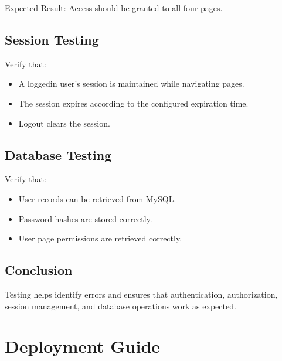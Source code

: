 \documentclass[letterpaper,10pt,english]{sphinxmanual}
\begin{document}
\sphinxAtStartPar
Expected Result: Access should be granted to all four pages.


\subsection{Session Testing}
\label{\detokenize{testing:session-testing}}
\sphinxAtStartPar
Verify that:
\begin{itemize}
\item {} 
\sphinxAtStartPar
A logged\sphinxhyphen{}in user’s session is maintained while navigating pages.

\item {} 
\sphinxAtStartPar
The session expires according to the configured expiration time.

\item {} 
\sphinxAtStartPar
Logout clears the session.

\end{itemize}


\subsection{Database Testing}
\label{\detokenize{testing:database-testing}}
\sphinxAtStartPar
Verify that:
\begin{itemize}
\item {} 
\sphinxAtStartPar
User records can be retrieved from MySQL.

\item {} 
\sphinxAtStartPar
Password hashes are stored correctly.

\item {} 
\sphinxAtStartPar
User page permissions are retrieved correctly.

\end{itemize}


\subsection{Conclusion}
\label{\detokenize{testing:conclusion}}
\sphinxAtStartPar
Testing helps identify errors and ensures that authentication, authorization,
session management, and database operations work as expected.

\sphinxstepscope


\section{Deployment Guide}
\label{\detokenize{deployment:deployment-guide}}\label{\detokenize{deployment::doc}}
\end{document}
